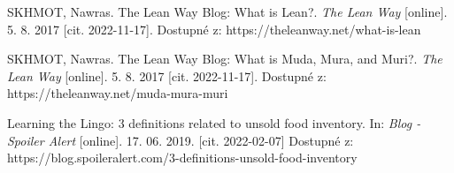 \begin{thebibliography}{1}
SKHMOT, Nawras. The Lean Way Blog: What is Lean?. \textit{The Lean Way} [online]. 5. 8. 2017 [cit. 2022-11-17]. Dostupné z: https://theleanway.net/what-is-lean

SKHMOT, Nawras. The Lean Way Blog: What is Muda, Mura, and Muri?. \textit{The Lean Way} [online]. 5. 8. 2017 [cit. 2022-11-17]. Dostupné z:
https://theleanway.net/muda-mura-muri

Learning the Lingo: 3 definitions related to unsold food inventory. In: \textit{Blog - Spoiler Alert} [online]. 17. 06. 2019. [cit. 2022-02-07] Dostupné z: https://blog.spoileralert.com/3-definitions-unsold-food-inventory

\end{thebibliography}
	

	
	